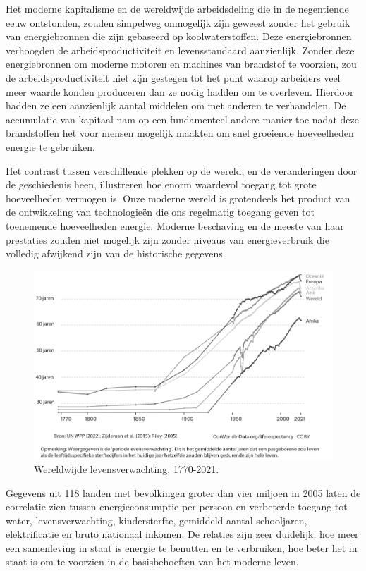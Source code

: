 Het moderne kapitalisme en de wereldwijde arbeidsdeling die in de negentiende eeuw ontstonden, zouden simpelweg onmogelijk zijn geweest zonder het gebruik van energiebronnen die zijn gebaseerd op koolwaterstoffen. Deze energiebronnen verhoogden de arbeidsproductiviteit en levensstandaard aanzienlijk. Zonder deze energiebronnen om moderne motoren en machines van brandstof te voorzien, zou de arbeidsproductiviteit niet zijn gestegen tot het punt waarop arbeiders veel meer waarde konden produceren dan ze nodig hadden om te overleven. Hierdoor hadden ze een aanzienlijk aantal middelen om met anderen te verhandelen. De accumulatie van kapitaal nam op een fundamenteel andere manier toe nadat deze brandstoffen het voor mensen mogelijk maakten om snel groeiende hoeveelheden energie te gebruiken.

Het contrast tussen verschillende plekken op de wereld, en de veranderingen door de geschiedenis heen, illustreren hoe enorm waardevol toegang tot grote hoeveelheden vermogen is. Onze moderne wereld is grotendeels het product van de ontwikkeling van technologieën die ons regelmatig toegang geven tot toenemende hoeveelheden energie. Moderne beschaving en de meeste van haar prestaties zouden niet mogelijk zijn zonder niveaus van energieverbruik die volledig afwijkend zijn van de historische gegevens.

\begin{figure}[!htb]
\centering
    \includegraphics[width=\textwidth]{figures/fig12-1.png}
    \caption[Wereldwijde levensverwachting, 1770-2021]{Wereldwijde levensverwachting, 1770-2021.}
    \label{fig12}
\end{figure}

Gegevens uit 118 landen met bevolkingen groter dan vier miljoen in 2005 laten de correlatie zien tussen energieconsumptie per persoon en verbeterde toegang tot water, levensverwachting, kindersterfte, gemiddeld aantal schooljaren, elektrificatie en bruto nationaal inkomen. \autocite{100} De relaties zijn zeer duidelijk: hoe meer een samenleving in staat is energie te benutten en te verbruiken, hoe beter het in staat is om te voorzien in de basisbehoeften van het moderne leven.

